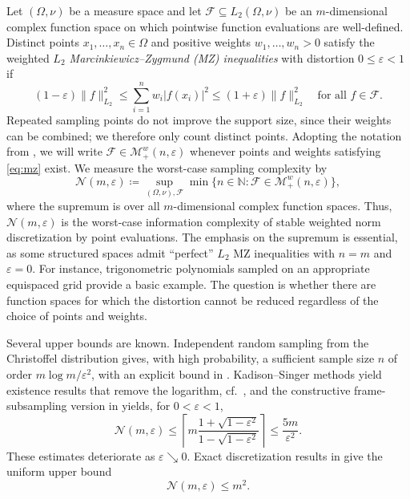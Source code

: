 \documentclass[a4paper]{amsart}
\numberwithin{equation}{section}
\begin{document}
Let $(\Omega,\nu)$ be a measure space and let $\mathcal F\subseteq L_2(\Omega,\nu)$ be an $m$-dimensional complex function space on which pointwise function evaluations are well-defined.
Distinct points $x_1,\dots,x_n\in\Omega$ and positive weights $w_1,\dots,w_n>0$ satisfy the weighted \emph{$L_2$ Marcinkiewicz--Zygmund (MZ) inequalities} with distortion $0\le\varepsilon<1$ if
\begin{equation}
    (1-\varepsilon)\|f\|_{L_2}^{2}
    \le \sum_{i=1}^{n} w_i |f(x_i)|^2
    \le (1+\varepsilon)\|f\|_{L_2}^{2}
    \quad\text{for all }f\in \mathcal F .
    \tag{MZ}\label{eq:mz}
\end{equation}
Repeated sampling points do not improve the support size, since their weights can be combined; we therefore only count distinct points.
Adopting the notation from \cite{DTT19}, we will write $\mathcal F\in \mathcal M_+^w(n,\varepsilon)$ whenever points and weights satisfying \eqref{eq:mz} exist.
We measure the worst-case sampling complexity by
\begin{equation*}
    \mathcal N(m,\varepsilon)
    \coloneqq \sup_{(\Omega,\nu), \mathcal F}
    \min\Big\{n\in\mathds N : \mathcal F\in\mathcal M_+^w(n,\varepsilon)\Big\} ,
\end{equation*}
where the supremum is over all $m$-dimensional complex function spaces.
Thus, $\mathcal N(m,\varepsilon)$ is the worst-case information complexity of stable weighted norm discretization by point evaluations.
The emphasis on the supremum is essential, as some structured spaces admit ``perfect'' $L_2$ MZ inequalities with $n=m$ and $\varepsilon=0$.
For instance, trigonometric polynomials sampled on an appropriate equispaced grid provide a basic example.
The question is whether there are function spaces for which the distortion cannot be reduced regardless of the choice of points and weights.

Several upper bounds are known.
Independent random sampling from the Christoffel distribution gives, with high probability, a sufficient sample size $n$ of order $m\log m/\varepsilon^2$, with an explicit bound in \cite{CDL13}.
Kadison--Singer methods yield existence results that remove the logarithm, cf.~\cite{NSU21}, and the constructive frame-subsampling version in \cite{BSU23} yields, for $0<\varepsilon<1$,
\begin{equation}\label{eq:constructive-upper}
    \mathcal N(m,\varepsilon)
    \le \left\lceil m \frac{1+\sqrt{1-\varepsilon^2}}{1-\sqrt{1-\varepsilon^2}}\right\rceil
    \le \frac{5m}{\varepsilon^2} .
\end{equation}
These estimates deteriorate as $\varepsilon\searrow 0$.
Exact discretization results in \cite{BKPSU25, ST25} give the uniform upper bound
\begin{equation}\label{eq:exact-upper}
    \mathcal N(m,\varepsilon) \le m^2.
\end{equation}
\end{document}
